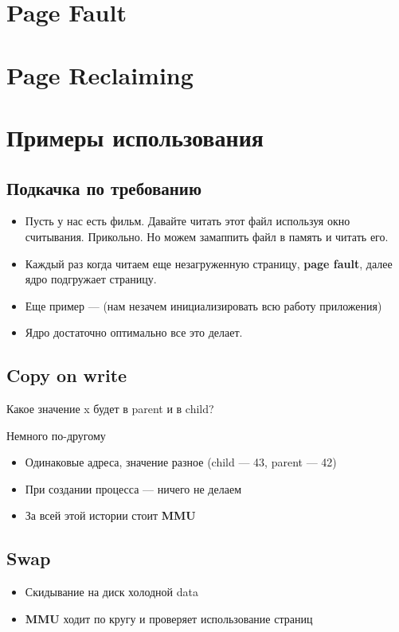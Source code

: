 \documentclass[../../lectures.tex]{subfiles}
\begin{document}
\section{Page Fault}

\section{Page Reclaiming}

\section{Примеры использования}
\subsection{Подкачка по требованию}
\begin{itemize}
    \item Пусть у нас есть фильм. Давайте читать этот файл используя
          окно считывания. Прикольно. Но можем замаппить файл в память 
          и читать его.
    \item Каждый раз когда читаем еще незагруженную страницу, \textbf{page fault},
          далее ядро подгружает страницу.
    \item Еще пример ---  (нам незачем инициализировать всю работу приложения)
    \item Ядро достаточно оптимально все это делает.
\end{itemize}
\subsection{Copy on write}
Какое значение x будет в parent и в child?

Немного по-другому
\begin{itemize}
    \item Одинаковые адреса, значение разное (child --- 43, parent --- 42)
    \item При создании процесса --- ничего не делаем
    \item За всей этой истории стоит \textbf{MMU}
\end{itemize}

\subsection{Swap}
\begin{itemize}
    \item Скидывание на диск холодной data
    \item \textbf{MMU} ходит по кругу и проверяет использование страниц
\end{itemize}
\end{document}
